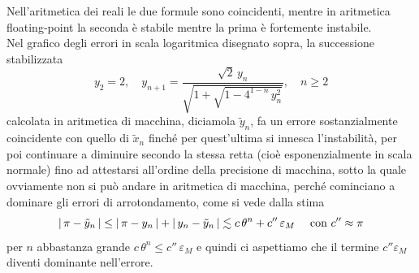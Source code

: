 Nell'aritmetica dei reali le due formule sono coincidenti, mentre in aritmetica floating-point la seconda è stabile mentre la prima è fortemente instabile.\\
Nel grafico degli errori in scala logaritmica disegnato sopra, la successione stabilizzata
\[ y_2=2, \quad y_{n+1}=\frac{\sqrt{2}\,y_n}{\sqrt{1+\sqrt{1-4^{1-n}\,y_n^2}}}, \quad n\ge 2 \]
calcolata in aritmetica di macchina, diciamola $\tilde{y}_n$, fa un errore sostanzialmente coincidente con quello di $\tilde{x}_n$ finché per quest'ultima si innesca l'instabilità, per poi continuare a diminuire secondo la stessa retta (cioè esponenzialmente in scala normale) fino ad attestarsi all'ordine della precisione di macchina, sotto la quale ovviamente non si può andare in aritmetica di macchina, perché cominciano a dominare gli errori di arrotondamento, come si vede dalla stima
\[\lvert\,\pi - \tilde{y}_n\,\rvert \le \lvert\,\pi - y_n\,\rvert + \lvert\,y_n - \tilde{y}_n\,\rvert \lesssim c\,\theta^{n}+c''\,\varepsilon_M \quad \text{ con } c''\approx \pi \]
per $n$ abbastanza grande $c\,\theta^n\le c''\,\varepsilon_M$ e quindi ci aspettiamo che il termine $c''\varepsilon_{M}$ diventi dominante nell'errore.
\newpage